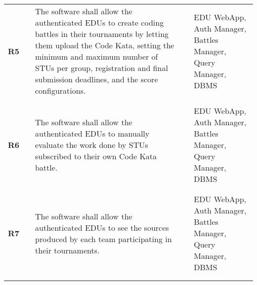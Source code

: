 \begin{longtable}[H]{l l p{6cm} l p{4cm}}
    \textbf{R5}             & \vline & The software shall allow the authenticated EDUs to create coding battles in their tournaments by letting them upload the Code Kata, setting the minimum and maximum number of STUs per group, registration and final submission deadlines, and the score configurations.     & \vline &  EDU WebApp, Auth Manager, Battles Manager, Query Manager, DBMS                          \\          
                            &        &                                                                                                                                                                                                                                                                              &        &                                                                                          \\\hline & & \\ 
    \textbf{R6}             & \vline & The software shall allow the authenticated EDUs to manually evaluate the work done by STUs subscribed to their own Code Kata battle.                                                                                                                                         & \vline &  EDU WebApp, Auth Manager, Battles Manager, Query Manager, DBMS                          \\          
                            &        &                                                                                                                                                                                                                                                                              &        &                                                                                          \\\hline & & \\ 
    \textbf{R7}             & \vline & The software shall allow the authenticated EDUs to see the sources produced by each team participating in their tournaments.                                                                                                                                                 & \vline &  EDU WebApp, Auth Manager, Battles Manager, Query Manager, DBMS                          \\          
                            &        &                                                                                                                                                                                                                                                                              &        &                                                                                          \\\hline & & \\ 

\end{longtable}
